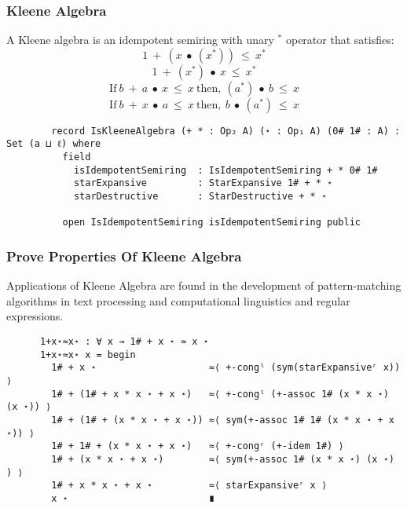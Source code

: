 \documentclass[xcolor={dvipsnames}]{beamer}
\begin{document}
\begin{frame}[fragile]
  \frametitle{Kleene Algebra}

    A Kleene algebra is an idempotent semiring with unary $^{*}$ operator that satisfies:
        \[ 1\ +\ (x\ ∙\ (x^{*}))\ \leq\ x^{*}\]
        \[ 1\ +\ (x^{*})\ ∙\ x\ \leq\ x^{*}\]
        \[\text{If} \ b\ +\ a\  ∙\ x\ \leq\ x\ \text{then},\ (a^{*})\ ∙\ b\ \leq\ x\]
        \[\text{If} \ b\ +\ x\ ∙\ a\ \leq\ x \  \text{then},\ b\ ∙\ (a^{*})\ \leq\ x\]

    \begin{verbatim}
        record IsKleeneAlgebra (+ * : Op₂ A) (⋆ : Op₁ A) (0# 1# : A) : Set (a ⊔ ℓ) where
          field
            isIdempotentSemiring  : IsIdempotentSemiring + * 0# 1#
            starExpansive         : StarExpansive 1# + * ⋆
            starDestructive       : StarDestructive + * ⋆
    
          open IsIdempotentSemiring isIdempotentSemiring public
    \end{verbatim}
\end{frame}


\begin{frame}[fragile]
    \frametitle{Prove Properties Of Kleene Algebra}  
    Applications of Kleene Algebra are found in the development of
    pattern-matching algorithms in text processing and computational linguistics
    and regular expressions.
    \\
    \begin{verbatim}
      1+x⋆≈x⋆ : ∀ x → 1# + x ⋆ ≈ x ⋆
      1+x⋆≈x⋆ x = begin
        1# + x ⋆                    ≈⟨ +-congˡ (sym(starExpansiveʳ x)) ⟩ 
        1# + (1# + x * x ⋆ + x ⋆)   ≈⟨ +-congˡ (+-assoc 1# (x * x ⋆) (x ⋆)) ⟩ 
        1# + (1# + (x * x ⋆ + x ⋆)) ≈⟨ sym(+-assoc 1# 1# (x * x ⋆ + x ⋆)) ⟩ 
        1# + 1# + (x * x ⋆ + x ⋆)   ≈⟨ +-congʳ (+-idem 1#) ⟩ 
        1# + (x * x ⋆ + x ⋆)        ≈⟨ sym(+-assoc 1# (x * x ⋆) (x ⋆) ) ⟩ 
        1# + x * x ⋆ + x ⋆          ≈⟨ starExpansiveʳ x ⟩ 
        x ⋆                         ∎
      \end{verbatim}
  \end{frame}

\end{document}
